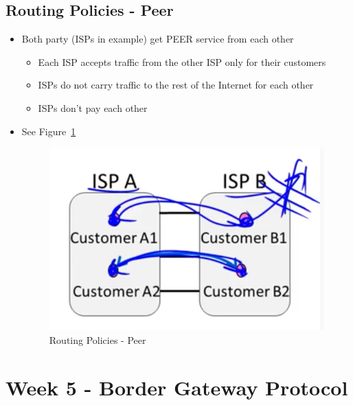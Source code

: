 \documentclass[12pt]{ctexart}   %
\begin{document}
	\subsection{Routing Policies - Peer}
	\begin{itemize}
		\item Both party (ISPs in example) get PEER service from each other
		\begin{itemize}
			\item Each ISP accepts traffic from the other ISP only for their customers
			\item ISPs do not carry traffic to the rest of the Internet for each other
			\item ISPs don't pay each other
		\end{itemize}
		\item See Figure~\ref{fig:5-11-5}
			
		\begin{figure}[h!] %
		\centering
		 \includegraphics[scale=0.7]{images/5-11-5}
		\caption{ Routing Policies - Peer }
		 \label{fig:5-11-5}
		 \end{figure}
	\end{itemize}

\section{ Week 5 - Border Gateway Protocol }
\end{document}
